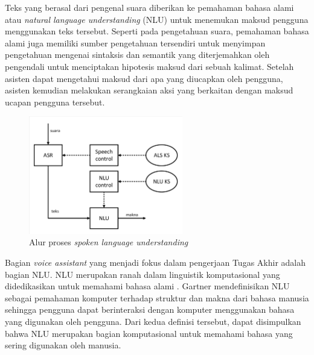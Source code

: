 Teks yang berasal dari pengenal suara diberikan ke pemahaman bahasa alami atau \textit{natural language understanding} (NLU) untuk menemukan maksud pengguna menggunakan teks tersebut. Seperti pada pengetahuan suara, pemahaman bahasa alami juga memiliki sumber pengetahuan tersendiri untuk menyimpan pengetahuan mengenai sintaksis dan semantik yang diterjemahkan oleh pengendali untuk menciptakan hipotesis maksud dari sebuah kalimat. Setelah asisten dapat mengetahui maksud dari apa yang diucapkan oleh pengguna, asisten kemudian melakukan serangkaian aksi yang berkaitan dengan maksud ucapan pengguna tersebut.
\begin{figure}[ht]
	\centering
	\includegraphics[width=0.6\textwidth, trim=2 2 2 2, clip]{resources/2/early_slu.pdf}
	\caption{Alur proses \textit{spoken language understanding} \parencite{tur2011spoken}}
	\label{fig:slu_early}
\end{figure}

Bagian \textit{voice assistant} yang menjadi fokus dalam pengerjaan Tugas Akhir adalah bagian NLU. NLU merupakan ranah dalam linguistik komputasional yang didedikasikan untuk memahami bahasa alami \parencite{harris2004voice}. Gartner \parencite{gartnernatural} mendefinisikan NLU sebagai pemahaman komputer terhadap struktur dan makna dari bahasa manusia sehingga pengguna dapat berinteraksi dengan komputer menggunakan bahasa yang digunakan oleh pengguna. Dari kedua definisi tersebut, dapat disimpulkan bahwa NLU merupakan bagian komputasional untuk memahami bahasa yang sering digunakan oleh manusia.

